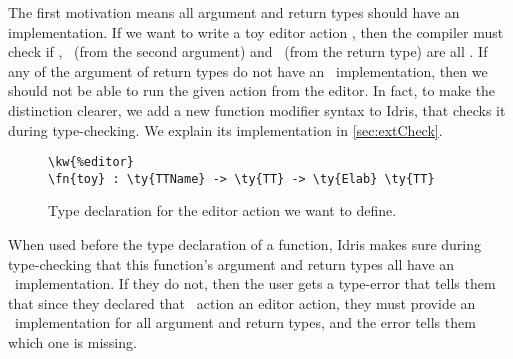 The first motivation means all argument and return types should have an
 implementation. If we want to write a toy editor action
,
then the compiler must check if , \TT\ (from the second argument)
and \TT\ (from the return type) are all \Editorable. If any of the argument of
return types do not have an \Editorable\ implementation, then we should not be
able to run the given action from the editor. In fact, to make the distinction
clearer, we add a new function modifier syntax  to Idris, that
checks it during type-checking.  We explain its implementation in
\autoref{sec:extCheck}.

\begin{figure}[ht]
\caption{Type declaration for the  editor action we want to define.}
\begin{Verbatim}[framesep=2mm, label=\footnotesize{\normalfont{Idris}}, labelposition=topline]
\kw{%editor}
\fn{toy} : \ty{TTName} -> \ty{TT} -> \ty{Elab} \ty{TT}
\end{Verbatim}
\end{figure}

When used before the type declaration of a function, Idris makes sure during
type-checking that this function's argument and return types all have an
\Editorable\ implementation. If they do not, then the user gets a type-error
that tells them that since they declared that \Elab\ action an editor action,
they must provide an \Editorable\ implementation for all argument and return
types, and the error tells them which one is missing.

